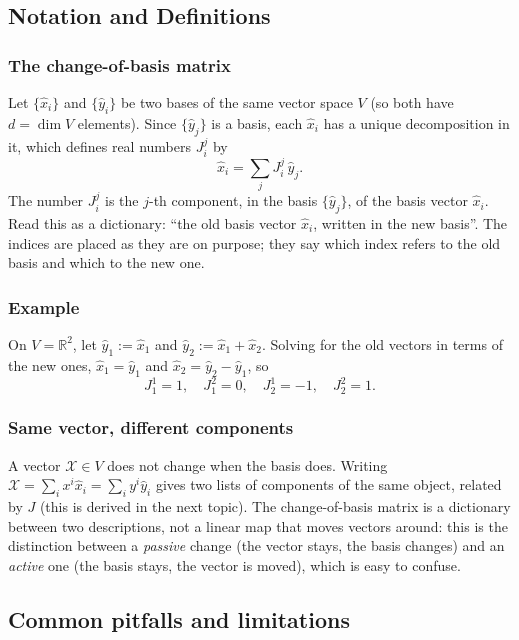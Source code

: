 \documentclass[11pt]{article}
\begin{document}
\subsection*{Notation and Definitions}

\subsubsection*{The change-of-basis matrix}
Let $\{\hat x_i\}$ and $\{\hat y_i\}$ be two bases of the same vector space $V$ (so both have $d=\dim V$ elements). Since $\{\hat y_j\}$ is a basis, each $\hat x_i$ has a unique decomposition in it, which defines real numbers $J^j_i$ by
\[
\hat x_i=\sum_j J_i^j\,\hat y_j.
\]
The number $J_i^j$ is the $j$-th component, in the basis $\{\hat y_j\}$, of the basis vector $\hat x_i$. Read this as a dictionary: ``the old basis vector $\hat x_i$, written in the new basis''. The indices are placed as they are on purpose; they say which index refers to the old basis and which to the new one.

\subsubsection*{Example}
On $V=\mathbb R^2$, let $\hat y_1:=\hat x_1$ and $\hat y_2:=\hat x_1+\hat x_2$. Solving for the old vectors in terms of the new ones, $\hat x_1=\hat y_1$ and $\hat x_2=\hat y_2-\hat y_1$, so
\[
J^1_1=1,\quad J^2_1=0,\quad J^1_2=-1,\quad J^2_2=1.
\]

\subsubsection*{Same vector, different components}
A vector $\mathcal X\in V$ does not change when the basis does. Writing $\mathcal X=\sum_ix^i\hat x_i=\sum_iy^i\hat y_i$ gives two lists of components of the same object, related by $J$ (this is derived in the next topic). The change-of-basis matrix is a dictionary between two descriptions, not a linear map that moves vectors around: this is the distinction between a \emph{passive} change (the vector stays, the basis changes) and an \emph{active} one (the basis stays, the vector is moved), which is easy to confuse.

\subsection*{Common pitfalls and limitations}
\end{document}
